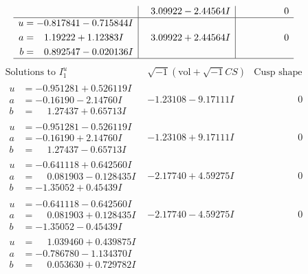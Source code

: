 \documentclass[1p]{elsarticle_modified}
\theoremstyle{definition}
\newcommand{\I}{\sqrt{-1}}
\begin{document}
$$\begin{array}{c|c|c}
 & \phantom{-}3.09922 - 2.44564 I & \phantom{-0.000000 } 0 \\ \hline\begin{aligned}
u &= -0.817841 - 0.715844 I \\
a &= \phantom{-}1.19222 + 1.12383 I \\
b &= \phantom{-}0.892547 - 0.020136 I\end{aligned}
 & \phantom{-}3.09922 + 2.44564 I & \phantom{-0.000000 } 0\\
 \hline 
 \end{array}$$\newpage$$\begin{array}{c|c|c}  
\text{Solutions to }I^u_{1}& \I (\text{vol} + \sqrt{-1}CS) & \text{Cusp shape}\\
 \hline 
\begin{aligned}
u &= -0.951281 + 0.526119 I \\
a &= -0.16190 - 2.14760 I \\
b &= \phantom{-}1.27437 + 0.65713 I\end{aligned}
 & -1.23108 - 9.17111 I & \phantom{-0.000000 } 0 \\ \hline\begin{aligned}
u &= -0.951281 - 0.526119 I \\
a &= -0.16190 + 2.14760 I \\
b &= \phantom{-}1.27437 - 0.65713 I\end{aligned}
 & -1.23108 + 9.17111 I & \phantom{-0.000000 } 0 \\ \hline\begin{aligned}
u &= -0.641118 + 0.642560 I \\
a &= \phantom{-}0.081903 - 0.128435 I \\
b &= -1.35052 + 0.45439 I\end{aligned}
 & -2.17740 + 4.59275 I & \phantom{-0.000000 } 0 \\ \hline\begin{aligned}
u &= -0.641118 - 0.642560 I \\
a &= \phantom{-}0.081903 + 0.128435 I \\
b &= -1.35052 - 0.45439 I\end{aligned}
 & -2.17740 - 4.59275 I & \phantom{-0.000000 } 0 \\ \hline\begin{aligned}
u &= \phantom{-}1.039460 + 0.439875 I \\
a &= -0.786780 - 1.134370 I \\
b &= \phantom{-}0.053630 + 0.729782 I\end{aligned}

\end{array}$$
\end{document}
